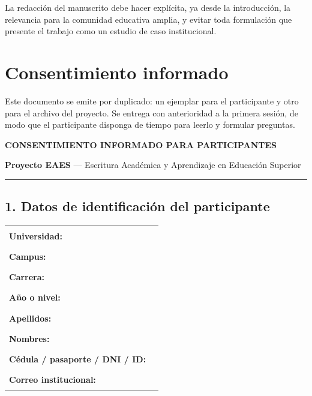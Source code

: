 \documentclass[12pt,a4paper,openany]{report}
\begin{document}
    La redacci\'on del manuscrito debe hacer expl\'icita, ya desde la introducci\'on, la relevancia para la comunidad educativa amplia, y evitar toda formulaci\'on que presente el trabajo como un estudio de caso institucional.
    
    \appendix
    \renewcommand{\chaptername}{Anexo}
    
    \chapter{Consentimiento informado}
    \label{anx:consentimiento}
    
    Este documento se emite por duplicado: un ejemplar para el participante y otro para el archivo del proyecto. Se entrega con anterioridad a la primera sesi\'on, de modo que el participante disponga de tiempo para leerlo y formular preguntas.
    
    \begin{center}
        {\sffamily\normalsize\bfseries\color{azulinstitucional} CONSENTIMIENTO INFORMADO PARA PARTICIPANTES\par}
        \vspace{2pt}
        {\sffamily\small\textbf{Proyecto EAES} --- Escritura Acad\'emica y Aprendizaje en Educaci\'on Superior\par}
    \end{center}
    
    \vspace{4pt}
    \hrule
    \vspace{6pt}
    
    \section*{1. Datos de identificaci\'on del participante}
    
    \begin{tabular}{@{}L{4.0cm}@{}L{9.8cm}@{}}
        \textbf{\small Universidad:} & \rule{9.6cm}{0.4pt} \\
        \textbf{\small Campus:} & \rule{9.6cm}{0.4pt} \\
        \textbf{\small Carrera:} & \rule{9.6cm}{0.4pt} \\
        \textbf{\small A\~no o nivel:} & \rule{9.6cm}{0.4pt} \\
        \textbf{\small Apellidos:} & \rule{9.6cm}{0.4pt} \\
        \textbf{\small Nombres:} & \rule{9.6cm}{0.4pt} \\
        \textbf{\small C\'edula / pasaporte / DNI / ID:} & \rule{9.6cm}{0.4pt} \\
        \textbf{\small Correo institucional:} & \rule{9.6cm}{0.4pt} \\
    \end{tabular}
    
\end{document}
